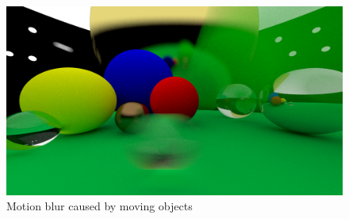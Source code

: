 \documentclass[12pt]{report}
\begin{document}
\begin{figure}[h!]
\includegraphics[width=\textwidth]{step10}
\centering
\caption{Motion blur caused by moving objects}
\label{fig:step10}
\end{figure}
\end{document}
